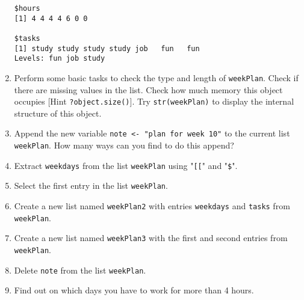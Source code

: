 \documentclass[a4paper]{article}
\begin{document}
\begin{enumerate}
\begin{verbatim}
$hours
[1] 4 4 4 4 6 0 0

$tasks
[1] study study study study job   fun   fun
Levels: fun job study
\end{verbatim}

\item Perform some basic tasks to check the type and length of
  \texttt{weekPlan}. Check if there are missing values in the list. Check how
  much memory this object occupies [Hint \texttt{?object.size()}].  Try
  \texttt{str(weekPlan)} to display the internal structure of this object.

\item Append the new variable \texttt{note <- "plan for week 10"} to the current
  list \texttt{weekPlan}. How many ways can you find to do this append?

\item Extract \texttt{weekdays} from the list \texttt{weekPlan} using
  "\texttt{[[}" and "\texttt{\$}".

\item Select the first entry in the list \texttt{weekPlan}.

\item Create a new list named \texttt{weekPlan2} with entries \texttt{weekdays}
  and \texttt{tasks} from \texttt{weekPlan}.

\item Create a new list named \texttt{weekPlan3} with the first and second
  entries from \texttt{weekPlan}.

\item Delete \texttt{note} from the list \texttt{weekPlan}.

\item Find out on which days you have to work for more than 4 hours.

\end{enumerate}
\end{document}
